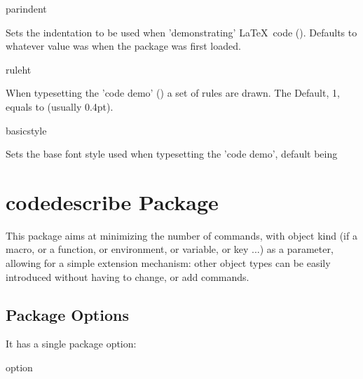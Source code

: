 \documentclass{article}
\begin{document}
\begin{codedescribe}[key]{parindent}
\begin{codesyntax} %
\end{codesyntax}
Sets the indentation to be used when 'demonstrating' \LaTeX\ code (\tsobj[code]{\tsdemo}). Defaults to whatever value \tsobj[code]{\parindent} was when the package was first loaded.
\end{codedescribe}

\begin{codedescribe}[key]{ruleht}%
\begin{codesyntax} %
\end{codesyntax}
When typesetting the 'code demo' (\tsobj{\tsdemo}) a set of rules are drawn. The Default, 1, equals to \tsobj{\arrayrulewidth} (usually 0.4pt).
\end{codedescribe}

\begin{codedescribe}[key,new=2023/11/18]{basicstyle}%
\begin{codesyntax} %
\end{codesyntax}
Sets the base font style used when typesetting the 'code demo', default being \tsobj{\footnotesize\ttfamily}
\end{codedescribe}


\section{codedescribe Package}

This package aims at minimizing the number of commands, with object kind (if a macro, or a function, or environment, or variable, or key ...) as a parameter, allowing for a simple extension mechanism: other object types can be easily introduced without having to change, or add commands.

\subsection{Package Options}
It has a single package option:

\begin{describelist}{option}
\end{describelist}
\end{document}
